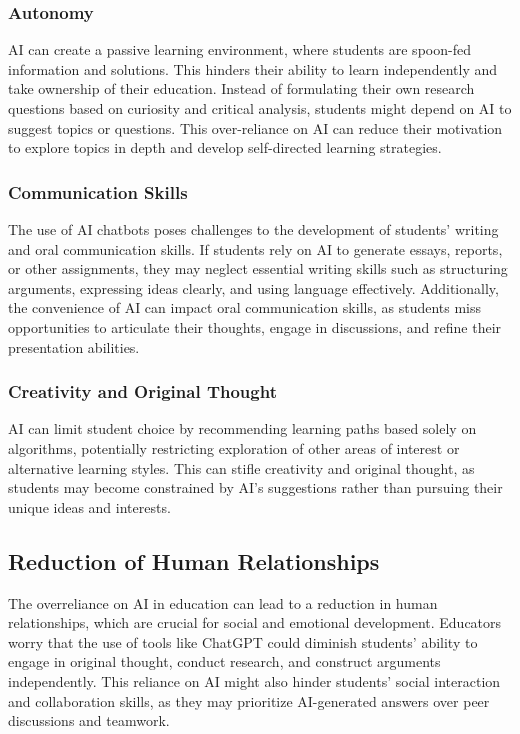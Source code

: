\documentclass{article}
\begin{document}
\subsubsection{Autonomy}

AI can create a passive learning environment, where students are spoon-fed information and solutions. This hinders their ability to learn independently and take ownership of their education. Instead of formulating their own research questions based on curiosity and critical analysis, students might depend on AI to suggest topics or questions. This over-reliance on AI can reduce their motivation to explore topics in depth and develop self-directed learning strategies.

\subsubsection{Communication Skills}

The use of AI chatbots poses challenges to the development of students' writing and oral communication skills. If students rely on AI to generate essays, reports, or other assignments, they may neglect essential writing skills such as structuring arguments, expressing ideas clearly, and using language effectively. Additionally, the convenience of AI can impact oral communication skills, as students miss opportunities to articulate their thoughts, engage in discussions, and refine their presentation abilities.

\subsubsection{Creativity and Original Thought}

AI can limit student choice by recommending learning paths based solely on algorithms, potentially restricting exploration of other areas of interest or alternative learning styles. This can stifle creativity and original thought, as students may become constrained by AI's suggestions rather than pursuing their unique ideas and interests.

\subsection{Reduction of Human Relationships}

The overreliance on AI in education can lead to a reduction in human relationships, which are crucial for social and emotional development. Educators worry that the use of tools like ChatGPT could diminish students' ability to engage in original thought, conduct research, and construct arguments independently. This reliance on AI might also hinder students' social interaction and collaboration skills, as they may prioritize AI-generated answers over peer discussions and teamwork.
\end{document}
